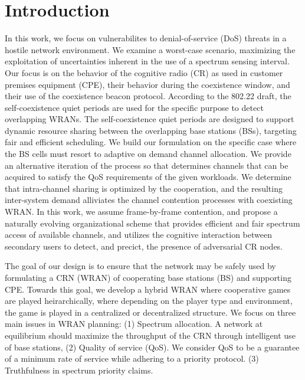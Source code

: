 \documentclass[10pt]{article}
\theoremstyle{definition}
\begin{document}
\section{Introduction}
In this work, we focus on vulnerabilites to denial-of-service (DoS) threats in
a hostile network environment. We examine a worst-case scenario, maximizing the
exploitation of uncertainties inherent in the use of a spectrum sensing interval.
Our focus is on the behavior of the cognitive radio (CR) as used in customer
premises equipment (CPE), their behavior during the coexistence window, and
their use of the coexistence beacon protocol. According to the 802.22 draft, the
self-coexistence quiet periods are used for the specific purpose to detect
overlapping WRANs. The self-coexistence quiet periods are designed to support
dynamic resource sharing between the overlapping base stations (BSs), targeting
fair and efficient scheduling. We build our formulation on the specific case where the BS cells must
resort to adaptive on demand channel allocation. We provide an alternative
iteration of the process so that determines channels that can be acquired to satisfy the
QoS requirements of the given workloads. We determine that intra-channel sharing
is optimized by the cooperation, and the resulting inter-system demand alliviates the channel contention processes
with coexisting WRAN. In this work, we assume frame-by-frame contention, and
propose a naturally evolving organizational scheme that provides efficient and fair spectrum access of
available channels, and utilizes the cognitive interaction between secondary
users to detect, and precict, the presence of adversarial CR nodes.


The goal of our design is to ensure that the network may be safely used by 
formulating a CRN (WRAN) of cooperating base stations (BS) and supporting CPE.
Towards this goal, we develop a hybrid WRAN where cooperative games are played 
heirarchically, where depending on the player type and environment, the game 
is played in a centralized or decentralized structure.
We focus on three main issues in WRAN planning: (1) Spectrum allocation. A
network at equilibrium should maximize the throughput of the CRN through
intelligent use of base stations, (2) Quality of service (QoS). We consider QoS
to be a guarantee of a minimum rate of service while adhering to a priority
protocol. (3) Truthfulness in spectrum priority claims. 
\end{document}
